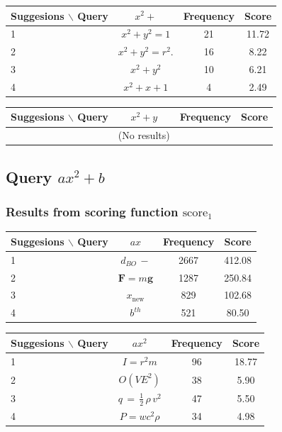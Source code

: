 \documentclass[12pt]{article} %
\begin{document}
\begin{center}
\begin{tabular}{lccc}
Suggesions $\backslash$ Query  & $x^2+ $ & Frequency & Score \\
\hline
 1 &  $ x^{2}+y^{2}=1 $ & 21 & 11.72 \\
 2 &  $ x^{2}+y^{2}=r^{2}.\! $ & 16 & 8.22 \\
 3 &  $ x^{2}+y^{2} $ & 10 & 6.21 \\
 4 &  $ x^{2}+x+1 $ & 4 & 2.49 \\
\end{tabular}
\end{center}

\begin{center}
\begin{tabular}{lccc}
Suggesions $\backslash$ Query  & $x^2 + y$ & Frequency & Score \\
\hline
 ~ &  (No results) & ~ & ~ \\
\end{tabular}
\end{center}


\subsection{Query $ax^2+b$}
\subsubsection{Results from scoring function $\text{score}_1$}

\begin{center}
\begin{tabular}{lccc}
Suggesions $\backslash$ Query  & $ ax $ & Frequency & Score \\
\hline
 1 &  $ d_{BO}\!\,- $ & 2667 & 412.08 \\
 2 &  $ \mathbf{F}=m\mathbf{g} $ & 1287 & 250.84 \\
 3 &  $ x_{\mathrm{new}} $ & 829 & 102.68 \\
 4 &  $ b^{th} $ & 521 & 80.50 \\
\end{tabular}
\end{center}

\begin{center}
\begin{tabular}{lccc}
Suggesions $\backslash$ Query  & $ ax^2 $ & Frequency & Score \\
\hline
 1 &  $ I=r^{2}m $ & 96 & 18.77 \\
 2 &  $ O(VE^{2}) $ & 38 & 5.90 \\
 3 &  $ q\,=\,\tfrac{1}{2}\,\rho\,v^{2} $ & 47 & 5.50 \\
 4 &  $ P=wc^{2}\rho $ & 34 & 4.98 \\
\end{tabular}
\end{center}
\end{document}
